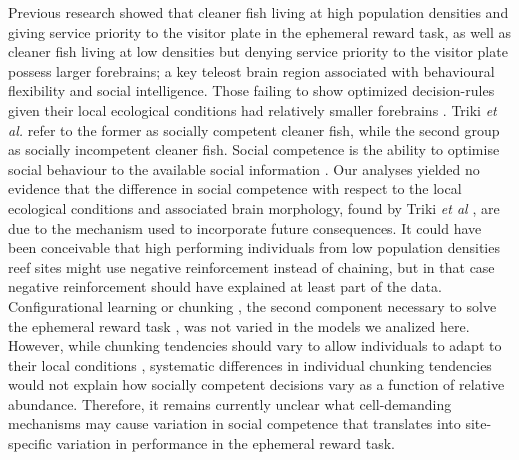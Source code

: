 \documentclass[]{rsos}%
\begin{document}
Previous research showed that cleaner fish living at high population
densities and giving service priority to the visitor plate in the
ephemeral reward task, as well as cleaner fish living at low
densities but denying service priority to the visitor plate possess
larger forebrains; a key teleost brain region associated with
behavioural flexibility and social intelligence. Those failing to
show optimized decision-rules given their local ecological
conditions had relatively smaller forebrains \citep{triki_Brain_2020}.
Triki \emph{et al.} refer to the former as socially competent cleaner fish,
while the second group as socially incompetent cleaner fish.
Social competence is the ability to optimise social behaviour
to the available social information \citep{taborsky_Social_2012a, bshary_Cooperation_2015, varela_Correlated_2020}. Our analyses yielded no
evidence that the difference in social competence with respect to the local
ecological conditions and associated brain morphology,
found by Triki \emph{et al} \citep{triki_Brain_2020}, are due to the mechanism
used to incorporate future consequences. It could have been conceivable that
high performing individuals from low population densities reef sites
might use negative reinforcement instead of chaining, but in that
case negative reinforcement should have explained at least
part of the data. Configurational learning or
chunking \citep{sutherland_Configural_1989, miller_Magical_1956},
the second component necessary to solve the ephemeral
reward task \citep{quinones_Reinforcement_2019}, was
not varied in the models we analized here. However, while chunking tendencies
should vary to allow individuals to adapt to their local conditions
\citep{prat_Modelling_2022, kolodny_Evolution_2014}, systematic differences
in individual chunking tendencies would not explain how socially
competent decisions vary as a function of relative abundance.
Therefore, it remains currently unclear what cell-demanding
mechanisms may cause variation in social competence that
translates into site-specific variation in performance in the
ephemeral reward task.
\end{document}

